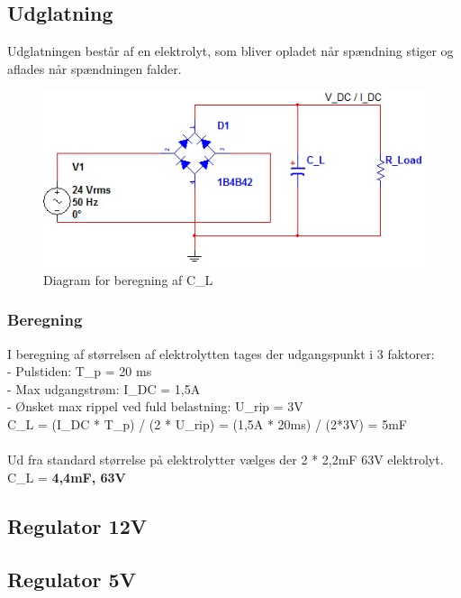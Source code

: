 \subsection{Udglatning}
Udglatningen består af en elektrolyt, som bliver opladet når spændning stiger og aflades når spændningen falder.
\begin{figure}[H]
\centering
\includegraphics[scale=0.7]{billeder/Udglatning}
\caption{Diagram for beregning af C\_L}
\label{fig:Udglatning}
\end{figure}
\subsubsection{Beregning} 
I beregning af størrelsen af elektrolytten tages der udgangspunkt i 3 faktorer:\\
- Pulstiden: T\_p = 20 ms\\
- Max udgangstrøm: I\_DC = 1,5A \\
- Ønsket max rippel ved fuld belastning: U\_rip = 3V\\
C\_L = (I\_DC * T\_p) / (2 * U\_rip) = (1,5A * 20ms) / (2*3V) = 5mF\\ \\
Ud fra standard størrelse på elektrolytter vælges der 2 * 2,2mF 63V elektrolyt. \\
C\_L = \textbf{4,4mF, 63V}




\subsection{Regulator 12V}
\subsection{Regulator 5V}


